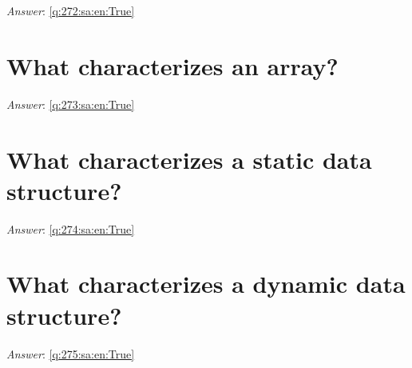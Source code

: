 \documentclass[a4paper,11pt,oneside]{book}
\begin{document}
\begin{sloppypar}
\label{q:272:sa:en:False}

\vspace{2cm}

\noindent\makebox[\textwidth]{\hrulefill}

\vspace{1cm}

\textit{Answer}: \autoref{q:272:sa:en:True}



\section{What characterizes an array?}

\label{q:273:sa:en:False}

\vspace{2cm}

\noindent\makebox[\textwidth]{\hrulefill}

\vspace{1cm}

\textit{Answer}: \autoref{q:273:sa:en:True}



\section{What characterizes a static data structure?}

\label{q:274:sa:en:False}

\vspace{2cm}

\noindent\makebox[\textwidth]{\hrulefill}

\vspace{1cm}

\textit{Answer}: \autoref{q:274:sa:en:True}



\section{What characterizes a dynamic data structure?}

\label{q:275:sa:en:False}

\vspace{2cm}

\noindent\makebox[\textwidth]{\hrulefill}

\vspace{1cm}

\textit{Answer}: \autoref{q:275:sa:en:True}




\end{sloppypar}
\end{document}
